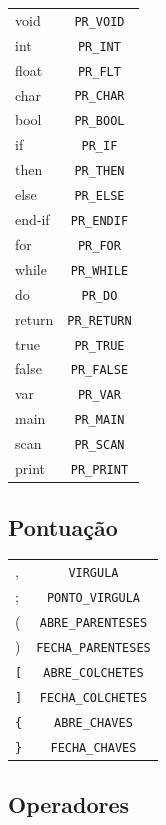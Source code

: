 \documentclass{article}
\begin{document}
\begin{tabular}{ l | c }
void & \texttt{PR\_VOID}  \\
int & \texttt{PR\_INT}  \\
float & \texttt{PR\_FLT}  \\
char & \texttt{PR\_CHAR}  \\
bool & \texttt{PR\_BOOL}  \\
if & \texttt{PR\_IF}  \\
then & \texttt{PR\_THEN}  \\
else & \texttt{PR\_ELSE}  \\
end-if & \texttt{PR\_ENDIF}  \\
for & \texttt{PR\_FOR}  \\
while & \texttt{PR\_WHILE}  \\
do & \texttt{PR\_DO}  \\
return & \texttt{PR\_RETURN}  \\
true & \texttt{PR\_TRUE}  \\
false & \texttt{PR\_FALSE}  \\
var & \texttt{PR\_VAR}  \\
main & \texttt{PR\_MAIN}  \\
scan & \texttt{PR\_SCAN}  \\
print & \texttt{PR\_PRINT}  \\
\end{tabular}

\subsection{Pontuação}

\begin{tabular}{ l | c }
, & \texttt{VIRGULA} \\
; & \texttt{PONTO\_VIRGULA} \\
( & \texttt{ABRE\_PARENTESES} \\
) & \texttt{FECHA\_PARENTESES} \\
 \texttt{[} & \texttt{ABRE\_COLCHETES} \\
 \texttt{]} & \texttt{FECHA\_COLCHETES} \\
 \texttt{\{} & \texttt{ABRE\_CHAVES} \\
 \texttt{\}} & \texttt{FECHA\_CHAVES} \\
\end{tabular}

\subsection{Operadores}
\end{document}
